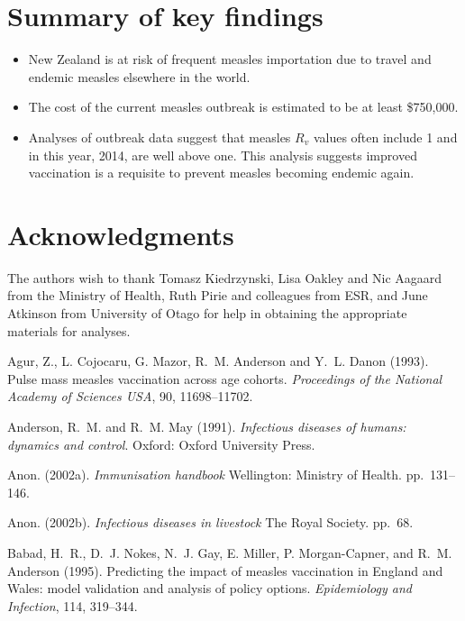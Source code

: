\documentclass{article}
\begin{document}
{\section {Summary of key findings}
\begin{itemize}
\item New Zealand is at risk of frequent measles importation due to travel and endemic measles elsewhere in the world.
\item The cost of the current measles outbreak is estimated to be at least \$750,000.
\item Analyses of outbreak data suggest that measles $R_v$ values often include 1 and in this year, 2014, are well above one. This analysis suggests improved vaccination is a requisite to prevent measles becoming endemic again.
\end{itemize}

\section{Acknowledgments}
The authors wish to thank Tomasz Kiedrzynski, Lisa Oakley and Nic Aagaard from the Ministry of Health, Ruth Pirie and colleagues from ESR, and June Atkinson from University of Otago for help in obtaining the appropriate materials for analyses.

\begin{thebibliography}{}



Agur, Z., L. Cojocaru, G. Mazor, R.~M. Anderson and Y.~L. Danon (1993).
\newblock Pulse mass measles vaccination across age cohorts.
\newblock \emph{Proceedings of the National Academy of Sciences USA}, 90, 11698--11702.

Anderson, R.~M. and R.~M. May (1991).
\newblock \emph{Infectious diseases of humans: dynamics and control}. Oxford: Oxford University Press.

Anon. (2002a).
\newblock \emph{Immunisation handbook}
\newblock Wellington: Ministry of Health. pp.~131--146.

Anon. (2002b).
\newblock \emph{Infectious diseases in livestock}
\newblock The Royal Society. pp.~68.

Babad, H.~R., D.~J. Nokes, N.~J. Gay, E. Miller, P. Morgan-Capner, and R.~M. Anderson (1995).
\newblock Predicting the impact of measles vaccination in England and Wales: model validation and analysis of policy options.
\newblock \emph{Epidemiology and Infection}, 114, 319--344.


\end{thebibliography}}
\end{document}
